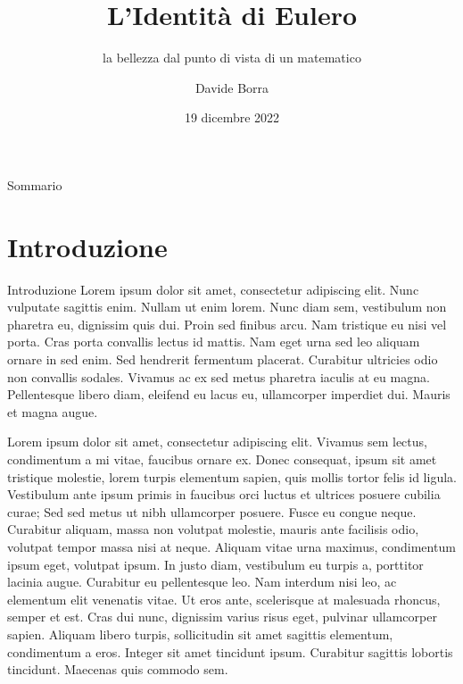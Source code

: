 \documentclass[10pt,xcolor={table,dvipsnames},t, aspectratio=169, notheorems, mathserif]{beamer}
\title[Presentazione]{L'Identità di Eulero}
\subtitle{la bellezza dal punto di vista di un matematico}
\author{Davide Borra}
\institute{Matematica - UniTrento}
\date{19 dicembre 2022}
\begin{document}
\begin{frame}
  \titlepage
\end{frame}

\begin{frame}{Sommario}
 \tableofcontents
\end{frame}
\section{Introduzione}
\begin{frame}{Introduzione}
    Lorem ipsum dolor sit amet, consectetur adipiscing elit. Nunc vulputate sagittis enim. Nullam ut enim lorem. Nunc diam sem, vestibulum non pharetra eu, dignissim quis dui. Proin sed finibus arcu. Nam tristique eu nisi vel porta. Cras porta convallis lectus id mattis. Nam eget urna sed leo aliquam ornare in sed enim. Sed hendrerit fermentum placerat. Curabitur ultricies odio non convallis sodales. Vivamus ac ex sed metus pharetra iaculis at eu magna. Pellentesque libero diam, eleifend eu lacus eu, ullamcorper imperdiet dui. Mauris et magna augue.
\end{frame}
\begin{frame}
    \begin{theorem}
        Lorem ipsum dolor sit amet, consectetur adipiscing elit. Vivamus sem lectus, condimentum a mi vitae, faucibus ornare ex. Donec consequat, ipsum sit amet tristique molestie, lorem turpis elementum sapien, quis mollis tortor felis id ligula. Vestibulum ante ipsum primis in faucibus orci luctus et ultrices posuere cubilia curae; Sed sed metus ut nibh ullamcorper posuere. Fusce eu congue neque. Curabitur aliquam, massa non volutpat molestie, mauris ante facilisis odio, volutpat tempor massa nisi at neque. Aliquam vitae urna maximus, condimentum ipsum eget, volutpat ipsum. In justo diam, vestibulum eu turpis a, porttitor lacinia augue. Curabitur eu pellentesque leo. Nam interdum nisi leo, ac elementum elit venenatis vitae. Ut eros ante, scelerisque at malesuada rhoncus, semper et est. Cras dui nunc, dignissim varius risus eget, pulvinar ullamcorper sapien. Aliquam libero turpis, sollicitudin sit amet sagittis elementum, condimentum a eros. Integer sit amet tincidunt ipsum. Curabitur sagittis lobortis tincidunt. Maecenas quis commodo sem.
    \end{theorem}
\end{frame}
\end{document}
